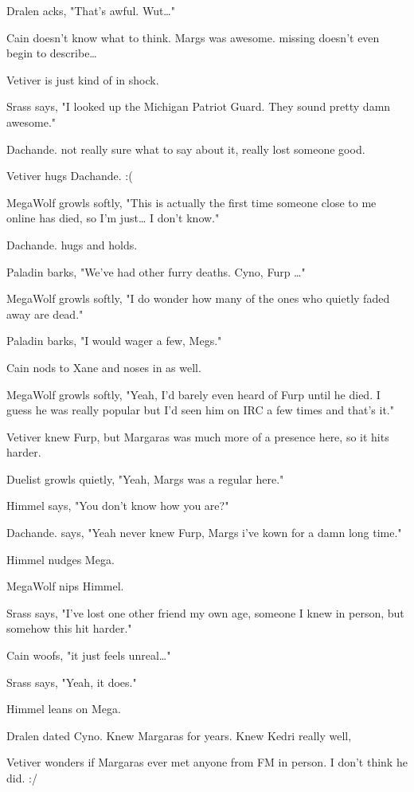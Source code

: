 \begin{hangparas}{2em}{1}
Dralen acks, "That's awful. Wut\ldots{}"

Cain doesn't know what to think. Margs was awesome. missing doesn't even begin to describe\ldots{}

Vetiver is just kind of in shock.

Srass says, "I looked up the Michigan Patriot Guard.  They sound pretty damn awesome."

Dachande. not really sure what to say about it, really lost someone good.

Vetiver hugs Dachande. :(

MegaWolf growls softly, "This is actually the first time someone close to me online has died, so I'm just\ldots{} I don't know."

Dachande. hugs and holds.

Paladin barks, "We've had other furry deaths. Cyno, Furp \ldots{}"

MegaWolf growls softly, "I do wonder how many of the ones who quietly faded away are dead."

Paladin barks, "I would wager a few, Megs."

Cain nods to Xane and noses in as well.

MegaWolf growls softly, "Yeah, I'd barely even heard of Furp until he died. I guess he was really popular but I'd seen him on IRC a few times and that's it."

Vetiver knew Furp, but Margaras was much more of a presence here, so it hits harder.

Duelist growls quietly, "Yeah, Margs was a regular here."

Himmel says, "You don't know how you are?"

Dachande. says, "Yeah never knew Furp, Margs i've kown for a damn long time."

Himmel nudges Mega.

MegaWolf nips Himmel.

Srass says, "I've lost one other friend my own age, someone I knew in person, but somehow this hit harder."

Cain woofs, "it just feels unreal\ldots{}"

Srass says, "Yeah, it does."

Himmel leans on Mega.

Dralen dated Cyno. Knew Margaras for years. Knew Kedri really well,

Vetiver wonders if Margaras ever met anyone from FM in person. I don't think he did. :/


\end{hangparas}
